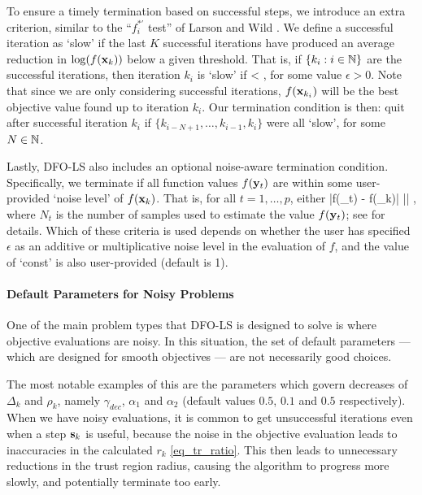 To ensure a timely termination based on successful steps, we introduce an extra criterion, similar to the ``$f_i^{*\prime}$ test'' of Larson and Wild \cite{Larson2013}.
We define a successful iteration as `slow' if the last $K$ successful iterations have produced an average reduction in $\log(f(\mathbf{x}_k))$ below a given threshold.
That is, if $\{k_i : i\in\mathbb{N}\}$ are the successful iterations, then iteration $k_i$ is `slow' if
\be {} < \epsilon, \label{eq_slow_termination_defn} \ee
for some value $\epsilon>0$.
Note that since we are only considering successful iterations, $f(\mathbf{x}_{k_i})$ will be the best objective value found up to iteration $k_i$.
Our termination condition is then: quit after successful iteration $k_i$ if $\{k_{i-N+1},\ldots,k_{i-1},k_i\}$ were all `slow', for some $N\in\mathbb{N}$.

Lastly, DFO-LS also includes an optional noise-aware termination condition.
Specifically, we terminate if all function values $f(\mathbf{y}_t)$ are within some user-provided `noise level' of $f(\mathbf{x}_k)$. That is, for all $t=1,\ldots,p$, either
\be |f(\by_t) - f(\bx_k)| \leq {}\cdot {} \qquad {} \qquad \left|\right| \leq {}\cdot {}, \label{eq_termination_noise} \ee
where $N_t$ is the number of samples used to estimate the value $f(\mathbf{y}_t)$; see  for details.
Which of these criteria is used depends on whether the user has specified $\epsilon$ as an additive or multiplicative noise level in the evaluation of $f$, and the value of `const' is also user-provided (default is 1).


\paragraph{Default Parameters for Noisy Problems}
One of the main problem types that DFO-LS is designed to solve is where objective evaluations are noisy.
In this situation, the set of default parameters --- which are designed for smooth objectives --- are not necessarily good choices.

The most notable examples of this are the parameters which govern decreases of $\Delta_k$ and $\rho_k$, namely $\gamma_{dec}$, $\alpha_1$ and $\alpha_2$ (default values $0.5$, $0.1$ and $0.5$ respectively).
When we have noisy evaluations, it is common to get unsuccessful iterations even when a step $\mathbf{s}_k$ is useful, because the noise in the objective evaluation leads to inaccuracies in the calculated $r_k$ \eqref{eq_tr_ratio}.
This then leads to unnecessary reductions in the trust region radius, causing the algorithm to progress more slowly, and potentially terminate too early.

